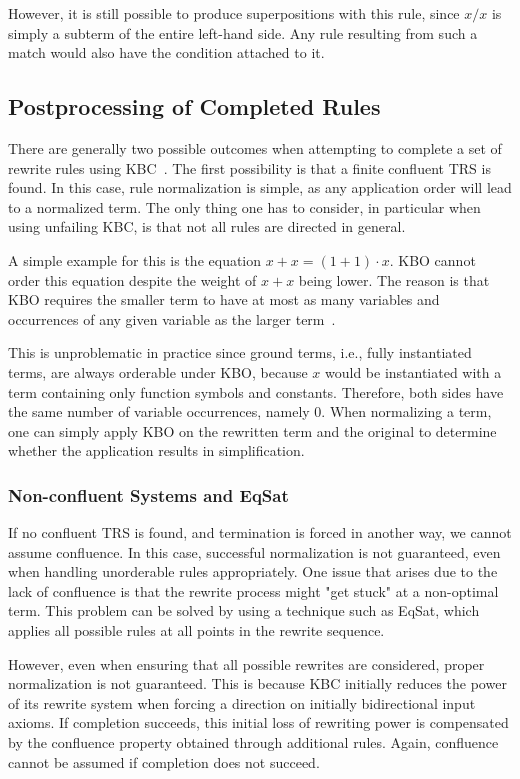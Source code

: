 However, it is still possible to produce superpositions with this rule, since $x/x$ is simply a subterm of the entire left-hand side. Any rule resulting from such a match would also have the condition attached to it.

\subsection{Postprocessing of Completed Rules}
\label{sec:rulegen-postprocess}
There are generally two possible outcomes when attempting to complete a set of rewrite rules using KBC~\citep{10.1093/comjnl/34.1.2}. The first possibility is that a finite confluent TRS is found. In this case, rule normalization is simple, as any application order will lead to a normalized term. The only thing one has to consider, in particular when using unfailing KBC, is that not all rules are directed in general.

A simple example for this is the equation $x+x = (1+1) \cdot x$. KBO cannot order this equation despite the weight of $x+x$ being lower. The reason is that KBO requires the smaller term to have at most as many variables and occurrences of any given variable as the larger term~\citep{BaaderNipkow1998}.

This is unproblematic in practice since ground terms, i.e., fully instantiated terms, are always orderable under KBO, because $x$ would be instantiated with a term containing only function symbols and constants. Therefore, both sides have the same number of variable occurrences, namely 0. When normalizing a term, one can simply apply KBO on the rewritten term and the original to determine whether the application results in simplification.

\subsubsection{Non-confluent Systems and EqSat}
\label{sec:non-confluence}
If no confluent TRS is found, and termination is forced in another way, we cannot assume confluence. In this case, successful normalization is not guaranteed, even when handling unorderable rules appropriately. One issue that arises due to the lack of confluence is that the rewrite process might "get stuck" at a non-optimal term. This problem can be solved by using a technique such as EqSat, which applies all possible rules at all points in the rewrite sequence.

However, even when ensuring that all possible rewrites are considered, proper normalization is not guaranteed. This is because KBC initially reduces the power of its rewrite system when forcing a direction on initially bidirectional input axioms. If completion succeeds, this initial loss of rewriting power is compensated by the confluence property obtained through additional rules. Again, confluence cannot be assumed if completion does not succeed.

